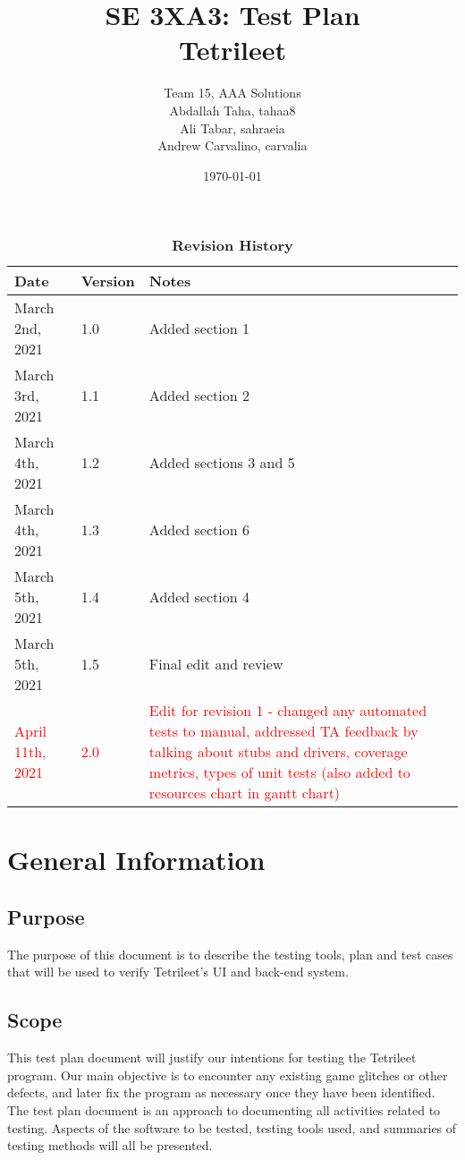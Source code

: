 \documentclass[12pt, titlepage]{article}
\title{SE 3XA3: Test Plan\\Tetrileet}
\author{Team 15, AAA Solutions
		\\ Abdallah Taha, tahaa8
		\\ Ali Tabar, sahraeia
		\\ Andrew Carvalino, carvalia
}
\date{\today}
\begin{document}
\maketitle

\tableofcontents
\listoftables
\listoffigures

\begin{table}[bp]
\caption{\bf Revision History}
\begin{tabularx}{\textwidth}{p{3cm}p{2cm}X}
\toprule {\bf Date} & {\bf Version} & {\bf Notes}\\
\midrule
March 2nd, 2021 & 1.0 & Added section 1\\
March 3rd, 2021 & 1.1 & Added section 2\\
March 4th, 2021 & 1.2 & Added sections 3 and 5\\
March 4th, 2021 & 1.3 & Added section 6\\
March 5th, 2021 & 1.4 & Added section 4\\
March 5th, 2021 & 1.5 & Final edit and review\\
\textcolor{red}{April 11th, 2021} &\textcolor{red}{2.0} & \textcolor{red}{Edit for revision 1 - changed any automated tests to manual, addressed TA feedback by talking about stubs and drivers, coverage metrics, types of unit tests (also added to resources chart in gantt chart)}\\
\bottomrule
\end{tabularx}
\end{table}

\newpage


\section{General Information}

\subsection{Purpose}
The purpose of this document is to describe the testing tools, plan and test cases that will be used to verify Tetrileet's UI and back-end system.
\subsection{Scope}
This test plan document will justify our intentions for testing the Tetrileet program. Our main objective is to encounter any existing game glitches or other defects, and later fix the program as necessary once they have been identified.\\
The test plan document is an approach to documenting all activities related to testing. 
Aspects of the software to be tested, testing tools used, and summaries of testing methods will all be presented. 
\end{document}
